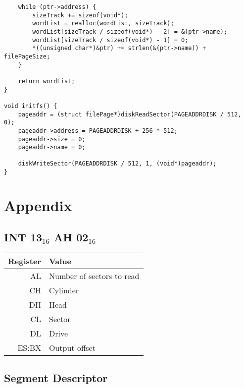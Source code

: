 \documentclass{article}
\begin{document}
\begin{verbatim}
	while (ptr->address) {
		sizeTrack += sizeof(void*);
		wordList = realloc(wordList, sizeTrack);
		wordList[sizeTrack / sizeof(void*) - 2] = &(ptr->name);
		wordList[sizeTrack / sizeof(void*) - 1] = 0;
		*((unsigned char*)&ptr) += strlen(&(ptr->name)) + filePageSize;
	}

	return wordList;
}

void initfs() {
	pageaddr = (struct filePage*)diskReadSector(PAGEADDRDISK / 512, 0);
	pageaddr->address = PAGEADDRDISK + 256 * 512;
	pageaddr->size = 0;
	pageaddr->name = 0;

	diskWriteSector(PAGEADDRDISK / 512, 1, (void*)pageaddr);
}
\end{verbatim}

\newpage

\section{Appendix}
\appendix

\subsection{INT 13$_{16}$ AH 02$_{16}$}
\label{int 13 ah 02}

\begin{tabular}{|r|l|}
	\hline
	\textbf{Register} & \textbf{Value} \\
	\hline
	AL & Number of sectors to read \\
	\hline
	CH & Cylinder \\
	\hline
	DH & Head \\
	\hline
	CL & Sector \\
	\hline
	DL & Drive \\
	\hline
	ES:BX & Output offset \\
	\hline
\end{tabular}

\subsection{Segment Descriptor}
\label{gdt}
\end{document}
